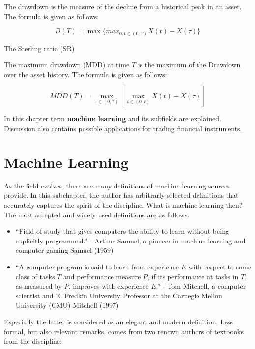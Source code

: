 \documentclass[]{article}
\providecommand{\tightlist}{%
  \setlength{\itemsep}{0pt}\setlength{\parskip}{0pt}}
\begin{document}
The drawdown is the measure of the decline from a historical peak in an
asset. The formula is given as follows:

\[
D(T)=\max\{max_{0, t\in (0,T)} X(t)-X(\tau)\}
\]

The Sterling ratio (SR)

The maximum drawdown (MDD) at time \(T\) is the maximum of the Drawdown
over the asset history. The formula is given as follows:

\[
MDD(T)=\max_{\tau\in (0,T)}[\max_{t\in (0,\tau)} X(t)-X(\tau)]
\]

In this chapter term \textbf{machine learning} and its subfields are
explained. Discussion also contains possible applications for trading
financial instruments.

\section{Machine Learning}\label{machine-learning}

As the field evolves, there are many definitions of machine learning
sources provide. In this subchapter, the author has arbitrarly selected
definitions that accurately captures the spirit of the discipline. What
is machine learning then? The most accepted and widely used definitions
are as follows:

\begin{itemize}
\tightlist
\item
  ``Field of study that gives computers the ability to learn without
  being explicitly programmed.'' - Arthur Samuel, a pioneer in machine
  learning and computer gaming Samuel (1959)
\item
  ``A computer program is said to learn from experience \(E\) with
  respect to some class of tasks \(T\) and performance measure \(P\), if
  its performance at tasks in \(T\), as measured by \(P\), improves with
  experience \(E\).'' - Tom Mitchell, a computer scientist and E.
  Fredkin University Professor at the Carnegie Mellon University (CMU)
  Mitchell (1997)
\end{itemize}

Especially the latter is considered as an elegant and modern definition.
Less formal, but also relevant remarks, comes from two renown authors of
textbooks from the discipline:
\end{document}
